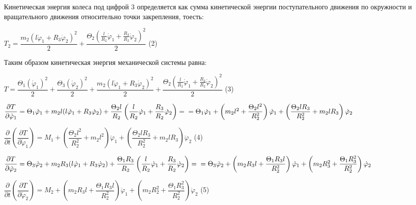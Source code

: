 \documentclass[a4paper, 12pt]{article}
\begin{document}
	\quad Кинетическая энергия колеса под цифрой 3 определяется как сумма кинетической энергии поступательного движения по окружности и вращательного движения относительно точки закрепления, тоесть:
	
	\begin{center}
		$T_2 = \dfrac{m_2(l\dot\varphi_1 + R_3 \dot\varphi_2)^2}{2} + \dfrac{\Theta_2 (\frac{l}{R_2} \dot\varphi_1 + \frac{R_3}{R_2} \dot\varphi_2 )^2}{2} $ (2)
	\end{center} 
	
	\quad Таким образом кинетическая энергия механической системы равна:
	
	\begin{center}
		$T = \dfrac{\Theta_1 (\dot\varphi_1)^2}{2} + \dfrac{\Theta_3 (\dot\varphi_2)^2}{2} + \dfrac{m_2(l\dot\varphi_1 + R_3 \dot\varphi_2)^2}{2} + \dfrac{\Theta_2 (\frac{l}{R_2} \dot\varphi_1 + \frac{R_3}{R_2} \dot\varphi_2 )^2}{2} $ (3)
		
		$\dfrac{\partial T}{\partial \dot\varphi_1} = \Theta_1 \dot\varphi_1 + m_2 l (l\dot\varphi_1 + R_3 \dot\varphi_2) + \dfrac{\Theta_2 l}{R_2} \left( \dfrac{l}{R_2} \dot\varphi_1 +  \dfrac{R_3}{R_2} \dot\varphi_2 \right) = \newline = \Theta_1 \dot\varphi_1 + \left( m_2 l^2 + \dfrac{\Theta_2 l^2}{R_2 ^2} \right) \dot\varphi_1 + \left(\dfrac{\Theta_2 l R_3}{R_2 ^2} + m_2 l  R_3 \right) \dot\varphi_2   $
		
		$\dfrac{\partial}{\partial t} \left( \dfrac{\partial T}{\partial \dot\varphi_1} \right) = M_1 + \left( \dfrac{\Theta_2 l^2}{R_2 ^2} + m_2 l^2 \right) \ddot \varphi_1 + \left( \dfrac{\Theta_2 l R_3}{R_2 ^2} + m_2 l R_3 \right)  \ddot\varphi_2 $ (4)
		
		$\dfrac{\partial T}{\partial \dot\varphi_2} = \Theta_3 \dot\varphi_2 + m_2 R_3 (l\dot\varphi_1 + R_3 \dot\varphi_2) +  \dfrac{\Theta_1 R_3}{R_2} \left( \dfrac{l}{R_2} \dot \varphi_1 + \dfrac{R_3}{R_2} \dot \varphi_2 \right) = \newline = \Theta_3 \dot\varphi_2 + \left( m_2 R_3 l + \dfrac{\Theta_1 R_3 l}{R_2 ^2}\right)\dot\varphi_1 + \left( m_2 R_3^2 + \dfrac{\Theta_1 R_3 ^2}{R_2 ^2 } \right)\dot\varphi_2$ 
		
		$ \dfrac{\partial }{\partial t} \left( \dfrac{\partial T}{\partial \dot \varphi_2} \right) = M_2 + \left( m_2 R_3 l  + \dfrac{\Theta_1 R_3 l}{R_2 ^2}\right) \ddot\varphi_1 + \left( m_2 R_2 ^2 + \dfrac{\Theta_1 R_3 ^2}{R_2 ^2} \right) \ddot\varphi_2 $ (5)
		
	\end{center}
	
\end{document}
